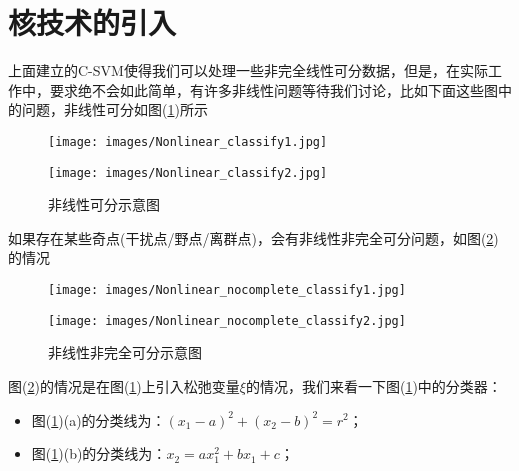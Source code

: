 \section{核技术的引入}
	\par
	上面建立的C-SVM使得我们可以处理一些非完全线性可分数据，但是，在实际工作中，要求绝不会如此简单，有许多非线性问题等待我们讨论，比如下面这些图中的问题，非线性可分如图(\ref{fig:非线性可分示意图})所示
		\begin{figure}[H]
		\centering
		\begin{varwidth}[t]{\textwidth}
		\vspace{0pt}
		\texttt{[image: images/Nonlinear\_classify1.jpg]}
		\end{varwidth}
		\qquad \qquad
		\begin{varwidth}[t]{\textwidth}
		\vspace{0pt}
		\texttt{[image: images/Nonlinear\_classify2.jpg]}
		\end{varwidth}
		\caption{非线性可分示意图}
		\label{fig:非线性可分示意图}
		\end{figure}
	如果存在某些奇点(干扰点/野点/离群点)，会有非线性非完全可分问题，如图(\ref{fig:非线性非完全可分示意图})的情况
		\begin{figure}[H]
		\centering
		\begin{varwidth}[t]{\textwidth}
		\vspace{0pt}
		\texttt{[image: images/Nonlinear\_nocomplete\_classify1.jpg]}
		\end{varwidth}
		\qquad \qquad
		\begin{varwidth}[t]{\textwidth}
		\vspace{0pt}
		\texttt{[image: images/Nonlinear\_nocomplete\_classify2.jpg]}
		\end{varwidth}
		\caption{非线性非完全可分示意图}
		\label{fig:非线性非完全可分示意图}
		\end{figure}
	图(\ref{fig:非线性非完全可分示意图})的情况是在图(\ref{fig:非线性可分示意图})上引入松弛变量$\xi$的情况，我们来看一下图(\ref{fig:非线性可分示意图})中的分类器：
	\begin{itemize}
	  \item 图(\ref{fig:非线性可分示意图})(a)的分类线为：$(x_1-a)^2+(x_2-b)^2=r^2$；
	  \item 图(\ref{fig:非线性可分示意图})(b)的分类线为：$x_2=ax_1^2+bx_1+c$；
	\end{itemize}
